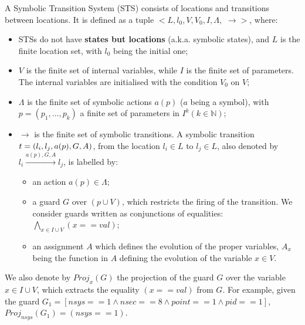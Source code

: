 \begin{definition}
	A Symbolic Transition System (STS) consists of locations and
    transitions between locations. It is defined as a tuple $<
    L,l_0,V,V_0,I,\Lambda,$ $\rightarrow>$, where:

	\begin{itemize}
        \item STSs do not have \textbf{states but locations}
        (a.k.a. symbolic states), and $L$ is the finite location
        set, with $l_0$ being the initial one;

        \item $V$ is the finite set of internal variables, while
        $I$ is the finite set of parameters. The internal
        variables are initialised with the condition $V_0$ on
        $V$;

        \item $\Lambda$ is the finite set of symbolic actions
        $a(p)$ ($a$ being a symbol), with $p=(p_1,\dots ,p_k)$ a
        finite set of parameters in $I^{k} (k \in \mathbb{N})$;

        \item $\rightarrow$ is the finite set of symbolic
            transitions. A symbolic transition $t =
            (l_i,l_j,a(p),G,\\A)$, from the location $l_i \in L$
            to $l_j \in L$, also denoted by $l_i
            \xrightarrow{a(p),G,A} l_j$, is labelled by:

		\begin{itemize}
            \item an action $a(p) \in \Lambda$;

            \item a guard $G$ over $(p \cup V)$, which
            restricts the firing of the transition. We consider
            guards written as conjunctions of equalities:
            $\displaystyle \bigwedge_{x \in I \cup V} (x ==
            val)$;

            \item an assignment $A$ which defines the evolution
            of the proper variables, $A_x$ being the function in
            $A$ defining the evolution of the variable $x \in V$.
		\end{itemize}
	\end{itemize}

	\label{def:sts}
\end{definition}

We also denote by $Proj_{x}(G)$ the projection of the guard $G$ over
the variable $x \in I \cup V$, which extracts the equality
$(x==val)$ from $G$. For example, given the guard $G_1 = [nsys==1
\wedge nsec==8 \wedge point==1 \wedge pid==1]$, $Proj_{nsys}(G_1)
= (nsys==1)$.

